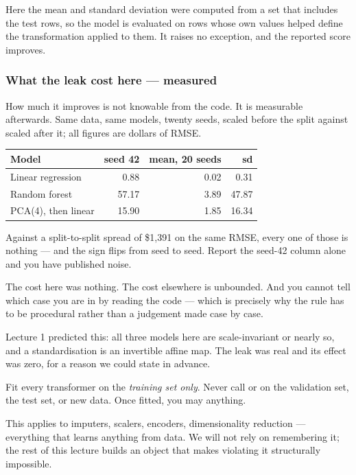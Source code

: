 \documentclass[11pt,a4paper]{article}
\begin{document}
Here the mean and standard deviation were computed from a set that includes the
test rows, so the model is evaluated on rows whose own values helped define the
transformation applied to them. It raises no exception, and the reported score
improves.

\subsubsection{What the leak cost here --- measured}

How much it improves is not knowable from the code. It is measurable
afterwards. Same data, same models, twenty seeds, scaled before the split
against scaled after it; all figures are dollars of RMSE.

\begin{center}
\small
\begin{tabular}{lrrr}
\toprule
\textbf{Model} & \textbf{seed 42} & \textbf{mean, 20 seeds} & \textbf{sd} \\
\midrule
Linear regression   &  0.88 & 0.02 &  0.31 \\
Random forest       & 57.17 & 3.89 & 47.87 \\
PCA(4), then linear & 15.90 & 1.85 & 16.34 \\
\bottomrule
\end{tabular}
\end{center}

Against a split-to-split spread of \$1{,}391 on the same RMSE, every one of
those is nothing --- and the sign flips from seed to seed. Report the seed-42
column alone and you have published noise.

\begin{keybox}[title={Why this is an argument \emph{for} the rule}]
The cost here was nothing. The cost elsewhere is unbounded. And you cannot tell
which case you are in by reading the code --- which is precisely why the rule
has to be procedural rather than a judgement made case by case.

Lecture 1 predicted this: all three models here are scale-invariant or nearly
so, and a standardisation is an invertible affine map. The leak was real and
its effect was zero, for a reason we could state in advance.
\end{keybox}

\begin{failbox}[title={The rule, stated once}]
Fit every transformer on the \emph{training set only}. Never call 
or  on the validation set, the test set, or new data.
Once fitted, you may  anything.

This applies to imputers, scalers, encoders, dimensionality reduction ---
everything that learns anything from data. We will not rely on remembering it;
the rest of this lecture builds an object that makes violating it structurally
impossible.
\end{failbox}
\end{document}
